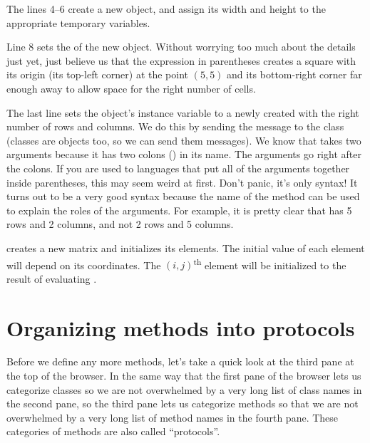 \documentclass[a4paper,10pt,twoside]{book}
\begin{document}
The lines 4--6 create a new  object, and assign its width and height to the appropriate temporary variables.

Line 8 sets the  of the new object.
Without worrying too much about the details just yet, just believe us that the expression in parentheses creates a square with its origin (\ie its top-left corner) at the point $(5,5)$ and its bottom-right corner far enough away to allow space for the right number of cells.

The last line sets the  object's instance variable  to a newly created  with the right number of rows and columns.
We do this by sending the message  to the  class (classes are objects too, so we can send them messages).
We know that  takes two arguments because it has two colons (\ct{:}) in its name.
The arguments go right after the colons.
If you are used to languages that put all of the arguments together inside parentheses, this may seem weird at first.
Don't panic, it's only syntax!
It turns out to be a very good syntax because the name of the method can be used to explain the roles of the arguments.
For example, it is pretty clear that  has 5 rows and 2 columns, and not 2 rows and 5 columns.

 creates a new  matrix and initializes its elements.
The initial value of each element will depend on its coordinates.
The {$(i,j)$}\textsuperscript{th} element will be initialized to the result of evaluating .

\section{Organizing methods into protocols}

Before we define any more methods, let's take a quick look at the third pane at the top of the browser.
In the same way that the first pane of the browser lets us categorize classes so we are not overwhelmed by a very long list of class names in the second pane, so the third pane lets us categorize methods so that we are not overwhelmed by a very long list of method names in the fourth pane.
These categories of methods are also called ``protocols''.
\end{document}
